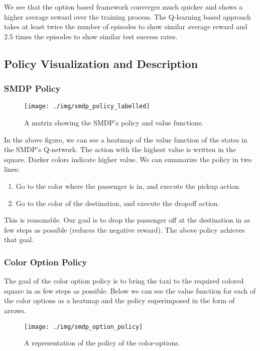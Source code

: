 \documentclass[A4]{article}
\begin{document}
    We see that the option based framework converges much quicker and shows a higher average reward over the training process.
    The Q-learning based approach takes at least twice the number of episodes to show similar average reward
    and 2.5 times the episodes to show similar test success rates.

    \subsection{Policy Visualization and Description}

    \subsubsection{SMDP Policy}
    \begin{figure}[H]
        \centering
        \texttt{[image: ./img/smdp\_policy\_labelled]}
        \caption{A matrix showing the SMDP's policy and value functions.}
    \end{figure}

    In the above figure, we can see a heatmap of the value function of the states in the SMDP's Q-network.
    The action with the highest value is written in the square.
    Darker colors indicate higher value.
    We can summarize the policy in two lines:
    \begin{enumerate}
        \item Go to the color where the passenger is in, and execute the pickup action.
        \item Go to the color of the destination, and execute the dropoff action.
    \end{enumerate}

    This is reasonable.
    Our goal is to drop the passenger off at the destination in as few steps as possible (reduces the negative reward).
    The above policy achieves that goal.

    \subsubsection{Color Option Policy}
    The goal of the color option policy is to bring the taxi to the required colored square in as few steps as possible.
    Below we can see the value function for each of the color options as a heatmap and the policy superimposed in the form of arrows.

    \begin{figure}[H]
        \centering
        \texttt{[image: ./img/smdp\_option\_policy]}
        \caption{A representation of the policy of the color-options.}
    \end{figure}
\end{document}
